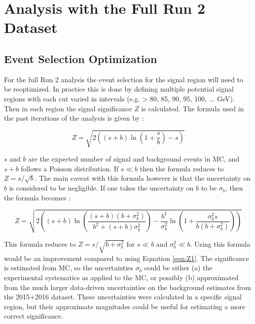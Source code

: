 \chapter{Analysis with the Full Run 2 Dataset}
\label{chapter:fullRun2}

\section{Event Selection Optimization}

For the full Run 2 analysis the event selection for the signal region will need to be reoptimized. In practice this is done by defining multiple potential signal regions with each cut varied in intervals (e.g. \etmiss > 80, 85, 90, 95, 100, ... GeV). Then in each region the signal significance $Z$ is calculated. The formula used in the past iterations of the analysis is given by \cite{Cowan1}:

\begin{equation}
Z = \sqrt{2 \left( (s+b) \ln \left( 1+\frac{s}{b} \right) -s \right)} 
\label{eqn:Z1}
\end{equation}

\noindent $s$ and $b$ are the expected number of signal and background events in MC, and $s+b$ follows a Poisson distribution. If $s \ll b$ then the formula reduces to $Z = s/\sqrt{b}$. The main caveat with this formula however is that the uncertainty on $b$ is considered to be negligible. If one takes the uncertainty on $b$ to be $\sigma_b$, then the formula becomes \cite{Cowan1}:

\begin{equation}
Z = \sqrt{2 \left( (s+b) \ln \left( \frac{(s+b)(b+\sigma_b^2)}{b^2+(s+b)\sigma_b^2} \right) - \frac{b^2}{\sigma_b^2} \ln \left( 1 + \frac{\sigma_b^2 s}{b(b+\sigma_b^2)} \right) \right)} 
\label{eqn:Z2}
\end{equation}

\noindent This formula reduces to $Z = s/\sqrt{b+\sigma_b^2}$ for $s \ll b$ and $\sigma_b^2 \ll b$. Using this formula would be an improvement compared to using Equation \ref{eqn:Z1}. The significance is estimated from MC, so the uncertainties $\sigma_b$ could be either (a) the experimental systematics as applied to the MC, or possibly (b) approximated from the much larger data-driven uncertainties on the background estimates from the 2015+2016 dataset. These uncertainties were calculated in a specific signal region, but their approximate magnitudes could be useful for estimating a more correct significance. 

